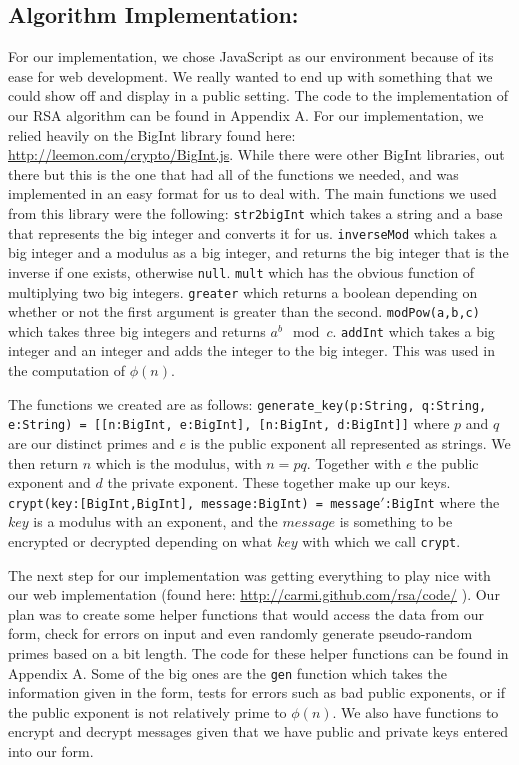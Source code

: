 \documentclass[11pt,twoside]{article}
\newcommand{\ty}[1]{\texttt{#1}}
\begin{document}
\begin{multicols}{2}
\section{Algorithm Implementation:}
For our implementation, we chose JavaScript as our environment because of its
ease for web development. We really wanted to end up with something that we
could show off and display in a public setting. The code to the implementation
of our RSA algorithm can be found in Appendix A. For our implementation, we
relied heavily on the BigInt library found here: 
\url{http://leemon.com/crypto/BigInt.js}.
While there were other BigInt libraries, out there but this is the one that had
all of the functions we needed, and was implemented in an easy format for us to
deal with. The main functions we used from this library were the following:
\ty{str2bigInt} which takes a string and a base that represents the big integer 
and converts it for us. 
\ty{inverseMod} which takes a big integer and a modulus as a big integer, and 
returns the big integer that is the inverse if one exists, otherwise \ty{null}. 
\ty{mult} which has the obvious function of multiplying two big integers.
\ty{greater} which returns a boolean depending on whether or not the first 
argument is greater than the second.
\ty{modPow(a,b,c)} which takes three big integers and returns $a^b \mod c$.  
\ty{addInt} which takes a big integer and an integer and adds the integer to 
the big integer. This was used in the computation of $\phi(n)$. 

The functions we created are as follows:
\ty{generate\_key(p:String, q:String, e:String) = [[n:BigInt, e:BigInt],
[n:BigInt, d:BigInt]]} where $p$ and $q$ are our distinct primes and $e$ is the
public exponent all represented as strings. We then return $n$ which is the
modulus, with $n = pq$. Together with $e$ the public exponent and $d$ the
private exponent. These together make up our keys.
\ty{crypt(key:[BigInt,BigInt], message:BigInt) = message$'$:BigInt} where the 
$key$ is a modulus with an exponent, and the $message$ is something to be 
encrypted or decrypted depending on what $key$ with which we call \ty{crypt}.

The next step for our implementation was getting everything to play nice with
our web implementation (found here: \url{http://carmi.github.com/rsa/code/} ).
Our plan was to create some helper functions that would access the data from
our form, check for errors on input and even randomly generate pseudo-random
primes based on a bit length. The code for these helper functions can be found
in Appendix A. Some of the big ones are the \ty{gen} function which takes the
information given in the form, tests for errors such as bad public exponents,
or if the public exponent is not relatively prime to $\phi(n)$. We also have
functions to encrypt and decrypt messages given that we have public and private
keys entered into our form.


\end{multicols}
\end{document}
